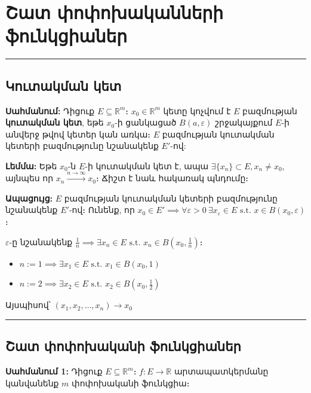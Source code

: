 \documentclass[12pt, a4paper]{article}
\begin{document}
\section{Շատ փոփոխականների ֆունկցիաներ}

\tableofcontents
\vspace{2em}
\hrule
\vspace{2em}

\subsection{Կուտակման կետ}

\textbf{Սահմանում:} Դիցուք $E \subseteq \mathbb{R}^m$։ $x_0 \in \mathbb{R}^m$ կետը կոչվում է $E$ բազմության \textbf{կուտակման կետ}, եթե $x_0$-ի ցանկացած $B(a, \varepsilon)$ շրջակայքում $E$-ի անվերջ թվով կետեր կան առկա։ 
$E$ բազմության կուտակման կետերի բազմությունը նշանակենք $E'$-ով:

\textbf{Լեմմա:} Եթե $x_0$-ն $E$-ի կուտակման կետ է, ապա $\exists \{x_n\} \subset E, x_n \neq x_0$, այնպես որ $x_n \overset{n \to \infty}{\longrightarrow} x_0$։ Ճիշտ է նաև հակառակ պնդումը։

\textbf{Ապացույց:} $E$ բազմության կուտակման կետերի բազմությունը նշանակենք $E'$-ով։ Ունենք, որ $x_0 \in E' \implies \forall \varepsilon > 0 \ \exists x_{\varepsilon} \in E \text{ s.t. } x \in B(x_0, \varepsilon)$։

$\varepsilon$-ը նշանակենք $\frac{1}{n} \implies \exists x_n \in E \text{ s.t. } x_n \in B(x_0, \frac{1}{n})$։

\begin{itemize}
    \item $n := 1 \implies \exists x_1 \in E \text{ s.t. } x_1 \in B(x_0, 1)$
    \item $n := 2 \implies \exists x_2 \in E \text{ s.t. } x_2 \in B(x_0, \frac{1}{2})$
\end{itemize}

Այսպիսով՝ $(x_1, x_2, \dots, x_n) \to x_0$
    
\vspace{1em}
\hrule
\vspace{1em}

\subsection{Շատ փոփոխականի ֆունկցիաներ}

\textbf{Սահմանում 1:} Դիցուք $E \subseteq \mathbb{R}^m$։ $f: E \to \mathbb{R}$ արտապատկերմանը կանվանենք $m$ փոփոխականի ֆունկցիա։
\end{document}
